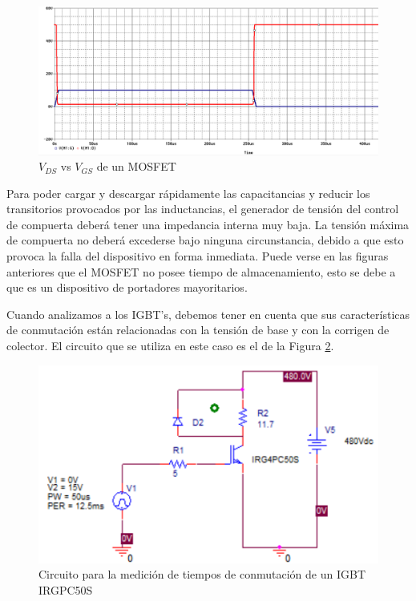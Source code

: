 \documentclass[conference]{IEEEtran}
\begin{document}
\begin{figure}[H]
	\centering
	\includegraphics[width=\columnwidth]{imagenes/vds_vgs_mosfet}
\caption{$V_{DS}$ vs $V_{GS}$ de un MOSFET}
	\label{fig:vds_vgs_mosfet}
\end{figure}

Para poder cargar y descargar rápidamente las capacitancias y reducir los transitorios provocados por las inductancias, el generador de tensión del control de compuerta deberá tener una impedancia interna muy baja. La tensión máxima de compuerta no deberá excederse bajo ninguna circunstancia, debido a que esto provoca la falla del dispositivo en forma inmediata. Puede verse en las figuras anteriores que el MOSFET no posee tiempo de almacenamiento, esto se debe a que es un dispositivo de portadores mayoritarios.

Cuando analizamos a los IGBT's, debemos tener en cuenta que sus características de conmutación están relacionadas con la tensión de base y con la corrigen de colector. El circuito que se utiliza en este caso es el de la Figura \ref{fig:circuit_igbt}.

\begin{figure}[H]
	\centering
	\includegraphics[width=\columnwidth]{imagenes/circuit_igbt}
	\caption{Circuito para la medición de tiempos de conmutación de un IGBT IRGPC50S}
	\label{fig:circuit_igbt}
\end{figure}
\end{document}
